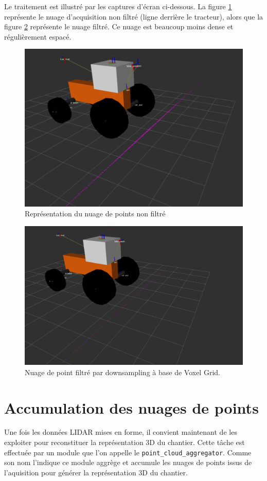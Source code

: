 \documentclass[12pt,a4paper]{report}
\begin{document}
		\para Le traitement est illustré par les captures d'écran ci-dessous. La figure \ref{fig:pointcloud-unfiltered} représente le nuage d'acquisition non filtré (ligne derrière le tracteur), alors que la figure \ref{fig:cloudback-filtered} représente le nuage filtré. Ce nuage est beaucoup moins dense et régulièrement espacé.
				
\begin{figure}[h!]
	\centering
	\includegraphics[width=0.7\linewidth]{img/pointcloud-unfiltered}
	\caption[pointcloud-unfiltered]{Représentation du nuage de points non filtré}
	\label{fig:pointcloud-unfiltered}
\end{figure}

\begin{figure}
	\centering
	\includegraphics[width=0.7\linewidth]{img/cloudback-filtered}
	\caption[pointcloud_filtered]{Nuage de point filtré par downsampling à base de Voxel Grid.}
	\label{fig:cloudback-filtered}
\end{figure}


		
	\section{Accumulation des nuages de points}
	
	Une fois les données LIDAR mises en forme, il convient maintenant de les exploiter pour reconstituer la représentation 3D du chantier. Cette tâche est effectuée par un module que l'on appelle le \verb|point_cloud_aggregator|. Comme son nom l'indique ce module aggrège et accumule les nuages de points issus de l'aquisition pour générer la représentation 3D du chantier.
	
\end{document}
